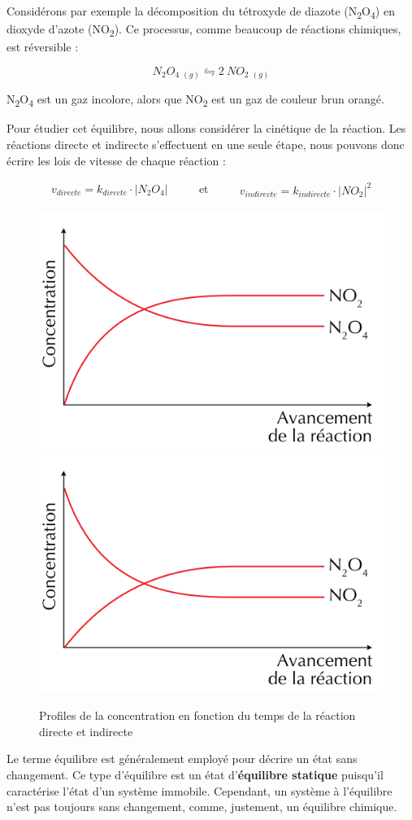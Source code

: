 \documentclass[
  11pt,
  french,
  a4paper,
  openany]{book}
\begin{document}
Considérons par exemple la décomposition du tétroxyde de diazote (N\textsubscript{2}O\textsubscript{4}) en dioxyde d'azote (NO\textsubscript{2}). Ce processus, comme beaucoup de réactions chimiques, est réversible :

\[
  N_2O_4\ {}_{(g)} \leftrightharpoons 2\ NO_2\ {}_{(g)}
\]

N\textsubscript{2}O\textsubscript{4} est un gaz incolore, alors que NO\textsubscript{2} est un gaz de couleur brun orangé.

Pour étudier cet équilibre, nous allons considérer la cinétique de la réaction. Les réactions directe et indirecte s'effectuent en une seule étape, nous pouvons donc écrire les lois de vitesse de chaque réaction :

\[
\begin{split}
  v_{directe} = k_{directe} \cdot |N_2O_4|
\end{split}
\qquad
\text{ et }
\qquad
\begin{split}
  v_{indirecte} = k_{indirecte} \cdot |NO_2|^2
\end{split}
\]

\begin{figure}

{\centering \includegraphics[width=0.33\linewidth]{images/equilibres-concentrations-1a} \includegraphics[width=0.33\linewidth]{images/equilibres-concentrations-1b} 

}

\caption{Profiles de la concentration en fonction du temps de la réaction directe et indirecte}\label{fig:equilibres-concentrations-1}
\end{figure}

Le terme équilibre est généralement employé pour décrire un état sans changement. Ce type d'équilibre est un état d'\textbf{équilibre statique} puisqu'il caractérise l'état d'un système immobile. Cependant, un système à l'équilibre n'est pas toujours sans changement, comme, justement, un équilibre chimique.
\end{document}
